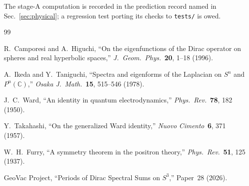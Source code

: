 \documentclass[11pt]{article}
\begin{document}
The stage-A computation is recorded in the prediction record named in
Sec.~\ref{sec:physical}; a regression test porting its checks to
\texttt{tests/} is owed.

\begin{thebibliography}{99}

R.~Camporesi and A.~Higuchi, ``On the eigenfunctions of the Dirac
operator on spheres and real hyperbolic spaces,''
\textit{J.~Geom.~Phys.}\ \textbf{20}, 1--18 (1996).

A.~Ikeda and Y.~Taniguchi, ``Spectra and eigenforms of the Laplacian on
$S^n$ and $P^n(\mathbb{C})$,'' \textit{Osaka J.~Math.}\ \textbf{15},
515--546 (1978).

J.~C.~Ward, ``An identity in quantum electrodynamics,''
\textit{Phys.~Rev.}\ \textbf{78}, 182 (1950).

Y.~Takahashi, ``On the generalized Ward identity,''
\textit{Nuovo Cimento}\ \textbf{6}, 371 (1957).

W.~H.~Furry, ``A symmetry theorem in the positron theory,''
\textit{Phys.~Rev.}\ \textbf{51}, 125 (1937).

GeoVac Project, ``Periods of Dirac Spectral Sums on $S^3$,''
Paper~28 (2026).

\end{thebibliography}
\end{document}
